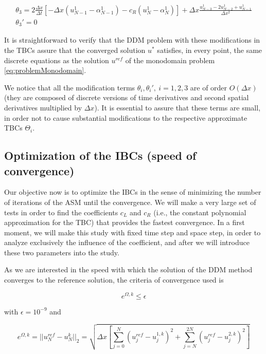 \begin{equation*}
\begin{gathered}
    \theta_3 = 2\frac{\Delta x}{\Delta t} \left[-\Delta x(u_{N-1}^1 - \alpha_{N-1}^1) - c_R (u_N^1 - \alpha_N^1) \right] + \Delta x \frac{u_{N-3}^1 - 2u_{N-2}^1 + u_{N-1}^1}{\Delta x^2} \\
    \theta_3' = 0
\end{gathered}
\end{equation*}

\indent It is straightforward to verify that the DDM problem with these modifications in the TBCs assure that the converged solution $u^*$ satisfies, in every point, the same discrete equations as the solution $u^{ref}$ of the monodomain problem \eqref{eq:problemMonodomain}.

\indent We notice that all the modification terms $\theta_i,\theta_i', \ i = 1,2,3$ are of order $O(\Delta x)$ (they are composed of discrete versions of time derivatives and second spatial derivatives multiplied by $\Delta x$). It is essential to assure that these terms are small, in order not to cause substantial modifications to the respective approximate TBCs $\Theta_i$.


\subsection{Optimization of the IBCs (speed of convergence)}

\indent Our objective now is to optimize the IBCs in the sense of minimizing the number of iterations of the ASM until the convergence. We will make a very large set of tests in order to find the coefficients $c_L$ and $c_R$ (i.e., the constant polynomial approximation for the TBC) that provides the fastest convergence. In a first moment, we will make this study with fixed time step and space step, in order to analyze exclusively the influence of the coefficient, and after we will introduce these two parameters into the study.

\indent As we are interested in the speed with which the solution of the DDM method converges to the reference solution, the criteria of convergence used is

\begin{equation*}
\label{eq:criteriaConvergence}
	e^{\Omega,k} \leq \epsilon
\end{equation*}

\noindent with $\epsilon = 10^{-9}$ and 

\begin{equation*}
	e^{\Omega,k} = ||u^{ref}_N - u^{k}_N||_2 = \sqrt{\Delta x \left[ \sum_{j=0}^N{(u^{ref}_j - u^{1,k}_j)^2 } + \sum_{j=N}^{2N}{(u^{ref}_j - u^{2,k}_j)^2 } \right] }
\end{equation*}
 
